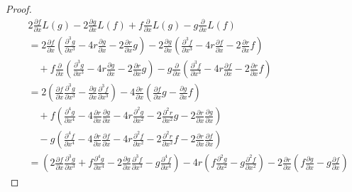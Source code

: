 \begin{proof}
\begin{align*}
    & 2 \frac{\partial f}{\partial x} L(g) - 2 \frac{\partial g}{\partial x} L(f) + f \frac{\partial}{\partial x} L(g) - g \frac{\partial}{\partial x} L(f) \\
    &= 2 \frac{\partial f}{\partial x} \left( \frac{\partial^3 g}{\partial x^3} - 4r \frac{\partial g}{\partial x} - 2 \frac{\partial r}{\partial x} g \right) - 2 \frac{\partial g}{\partial x} \left( \frac{\partial^3 f}{\partial x^3} - 4r \frac{\partial f}{\partial x} - 2 \frac{\partial r}{\partial x} f \right) \\
    &\quad + f \frac{\partial}{\partial x} \left( \frac{\partial^3 g}{\partial x^3} - 4r \frac{\partial g}{\partial x} - 2 \frac{\partial r}{\partial x} g \right) - g \frac{\partial}{\partial x} \left( \frac{\partial^3 f}{\partial x^3} - 4r \frac{\partial f}{\partial x} - 2 \frac{\partial r}{\partial x} f \right) \\
    &= 2 \left( \frac{\partial f}{\partial x}\frac{\partial^3 g}{\partial x^3} - \frac{\partial g}{\partial x}\frac{\partial^3 f}{\partial x^3} \right) - 4 \frac{\partial r}{\partial x} \left( \frac{\partial f}{\partial x}g - \frac{\partial g}{\partial x}f \right) \\
    &\quad + f \left( \frac{\partial^4 g}{\partial x^4} - 4 \frac{\partial r}{\partial x}\frac{\partial g}{\partial x} - 4r \frac{\partial^2 g}{\partial x^2} - 2 \frac{\partial^2 r}{\partial x^2}g - 2 \frac{\partial r}{\partial x}\frac{\partial g}{\partial x} \right) \\
    &\quad - g \left( \frac{\partial^4 f}{\partial x^4} - 4 \frac{\partial r}{\partial x}\frac{\partial f}{\partial x} - 4r \frac{\partial^2 f}{\partial x^2} - 2 \frac{\partial^2 r}{\partial x^2}f - 2 \frac{\partial r}{\partial x}\frac{\partial f}{\partial x} \right) \\
    &= \left( 2\frac{\partial f}{\partial x}\frac{\partial^3 g}{\partial x^3} + f\frac{\partial^4 g}{\partial x^4} - 2\frac{\partial g}{\partial x}\frac{\partial^3 f}{\partial x^3} - g\frac{\partial^4 f}{\partial x^4} \right) - 4r \left( f\frac{\partial^2 g}{\partial x^2} - g\frac{\partial^2 f}{\partial x^2} \right) - 2\frac{\partial r}{\partial x} \left( f\frac{\partial g}{\partial x} - g\frac{\partial f}{\partial x} \right)
\end{align*}


\end{proof}
